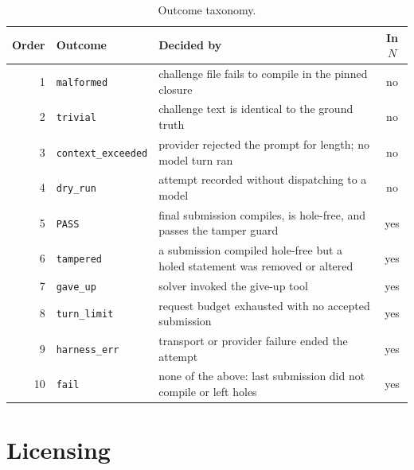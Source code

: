 \documentclass{article}
\begin{document}
\begin{table}[h]
  \caption{Outcome taxonomy.}
  \label{tab:outcome-predicates}
  \centering
  \footnotesize
  \begin{tabular}{rlp{7.6cm}c}
    \toprule
    Order & Outcome & Decided by & In $N$ \\
    \midrule
    1 & \texttt{malformed}         & challenge file fails to compile in the pinned closure & no \\
    2 & \texttt{trivial}           & challenge text is identical to the ground truth & no \\
    3 & \texttt{context\_exceeded} & provider rejected the prompt for length; no model turn ran & no \\
    4 & \texttt{dry\_run}          & attempt recorded without dispatching to a model & no \\
    \midrule
    5 & \texttt{PASS}              & final submission compiles, is hole-free, and passes the tamper guard & yes \\
    6 & \texttt{tampered}          & a submission compiled hole-free but a holed statement was removed or altered & yes \\
    7 & \texttt{gave\_up}          & solver invoked the give-up tool & yes \\
    8 & \texttt{turn\_limit}       & request budget exhausted with no accepted submission & yes \\
    9 & \texttt{harness\_err}      & transport or provider failure ended the attempt & yes \\
    10 & \texttt{fail}             & none of the above: last submission did not compile or left holes & yes \\
    \bottomrule
  \end{tabular}
\end{table}

\section{Licensing}
\label{app:licensing}
\end{document}
